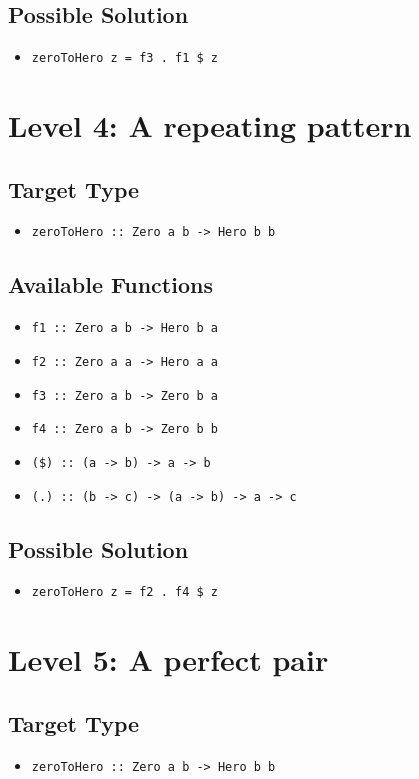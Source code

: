 \subsection*{Possible Solution} 
\begin{itemize}
    \item \texttt{zeroToHero z = f3 . f1 \$ z}
\end{itemize}


\section{Level 4: A repeating pattern}
\subsection*{Target Type } 
\begin{itemize}
    \item \texttt{zeroToHero :: Zero a b -> Hero b b}
\end{itemize}

\subsection*{Available Functions} 
\begin{itemize}
    \item \texttt{f1 :: Zero a b -> Hero b a}
    \item \texttt{f2 :: Zero a a -> Hero a a}
    \item \texttt{f3 :: Zero a b -> Zero b a}
    \item \texttt{f4 :: Zero a b -> Zero b b}
    \item \texttt{(\$) :: (a -> b) -> a -> b}
    \item \texttt{(.) :: (b -> c) -> (a -> b) -> a -> c}
\end{itemize}

\subsection*{Possible Solution} 
\begin{itemize}
    \item \texttt{zeroToHero z = f2 . f4 \$ z}
\end{itemize}


\section{Level 5: A perfect pair}
\subsection*{Target Type } 
\begin{itemize}
    \item \texttt{zeroToHero :: Zero a b -> Hero b b}
\end{itemize}

